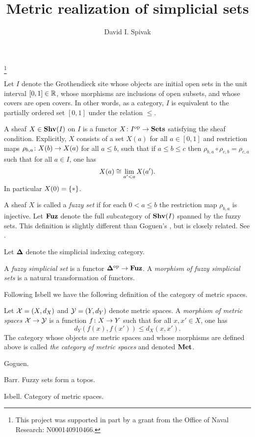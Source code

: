 \documentclass{amsart}
\def\Shv{\She}
\def\Met{{\bf Met}}
\def\bD{{\bf \Delta}}
\def\Fuz{{\bf Fuz}}
\begin{document}
\title{Metric realization of simplicial sets}

\author{David I. Spivak}

\thanks{This project was supported in part by a grant from the Office of Naval Research: N000140910466.}

Let $I$ denote the Grothendieck site whose objects are initial open sets in the unit interval $[0,1]\in{\mathbb R}$, whose morphisms are inclusions of open subsets, and whose covers are open covers.  In other words, as a category, $I$ is equivalent to the partially ordered set $[0,1]$ under the relation $\leq$.  

A sheaf $X\in\Shv(I)$ on $I$ is a functor $X\colon I^\textnormal{op}\rightarrow{\bf Sets}$ satisfying the sheaf condition.  Explicitly, $X$ consists of a set $X(a)$ for all $a\in[0,1]$ and restriction maps $\rho_{b,a}\colon X(b)\rightarrow X(a)$ for all $a\leq b$, such that if $a\leq b\leq c$ then $\rho_{b,a}\circ\rho_{c,b}=\rho_{c,a}$ such that for all $a\in I$, one has $$X(a)\cong\lim_{a'<a}X(a').$$   In particular $X(0)={\{\ast\}}$.

A sheaf $X$ is called a {\em fuzzy set} if for each $0<a\leq b$ the restriction map $\rho_{b,a}$ is injective.  Let $\Fuz$ denote the full subcategory of $\Shv(I)$ spanned by the fuzzy sets.  This definition is slightly different than Goguen's \cite{Gog}, but is closely related.  See \cite{Bar}.

Let $\bD$ denote the simplicial indexing category.

\begin{definition}

A {\em fuzzy simplicial set} is a functor $\bD\op\to\Fuz$.  A {\em morphism of fuzzy simplicial sets} is a natural transformation of functors.

\end{definition}

Following Isbell \cite{Isb} we have the following definition of the category of metric spaces.

\begin{definition}

Let $\mathcal{X}=(X,d_X)$ and $\mathcal{Y}=(Y,d_Y)$ denote metric spaces.  A {\em morphism of metric spaces} $\mathcal{X}\rightarrow\mathcal{Y}$ is a function $f\colon X\rightarrow Y$ such that for all $x,x'\in X$, one has $$d_Y(f(x),f(x'))\leq d_X(x,x').$$  The category whose objects are metric spaces and whose morphisms are defined above is called {\em the category of metric spaces} and denoted $\Met$.

\end{definition}


\begin{thebibliography}{JTT}

Goguen.

Barr. Fuzzy sets form a topos.

Isbell.  Category of metric spaces.

\end{thebibliography}
\end{document}
